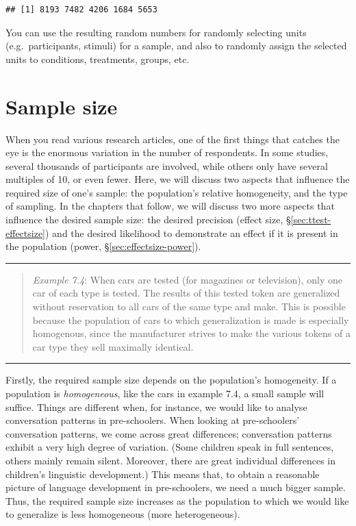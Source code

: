 \documentclass[
]{book}
\begin{document}
\begin{verbatim}
## [1] 8193 7482 4206 1684 5653
\end{verbatim}

You can use the resulting random numbers for randomly selecting units (e.g.~participants, stimuli) for a sample, and also to randomly assign the selected units to conditions, treatments, groups, etc.

\hypertarget{sec:sample-size}{%
\section{Sample size}\label{sec:sample-size}}

When you read various research articles, one of the first things that catches the eye is the enormous variation in the number of respondents. In some studies, several thousands of participants are involved, while others only have several multiples of 10, or even fewer. Here, we will discuss two aspects that influence the required size of one's sample: the population's relative homogeneity, and the type of sampling. In the chapters that follow, we will discuss two more aspects that influence the desired sample size: the desired precision (effect size, §\ref{sec:ttest-effectsize}) and the desired likelihood to demonstrate an effect if it is present in the population (power, §\ref{sec:effectsize-power}).

\begin{center}\rule{0.5\linewidth}{0.5pt}\end{center}

\begin{quote}
\emph{Example 7.4}: When cars are tested (for magazines or television), only one car of each type is tested. The results of this tested token are generalized without reservation to all cars of the same type and make. This is possible because the population of cars to which generalization is made is especially homogenous, since the manufacturer strives to make the various tokens of a car type they sell maximally identical.
\end{quote}

\begin{center}\rule{0.5\linewidth}{0.5pt}\end{center}

Firstly, the required sample size depends on the population's homogeneity. If a population is \emph{homogeneous}, like the cars in example 7.4, a small sample will suffice. Things are different when, for instance, we would like to analyse conversation patterns in pre-schoolers. When looking at pre-schoolers' conversation patterns, we come across great differences; conversation patterns exhibit a very high degree of variation. (Some children speak in full sentences, others mainly remain silent. Moreover, there are great individual differences in children's linguistic development.) This means that, to obtain a reasonable picture of language development in pre-schoolers, we need a much bigger sample. Thus, the required sample size increases as the population to which we would like to generalize is less homogeneous (more heterogeneous).
\end{document}
